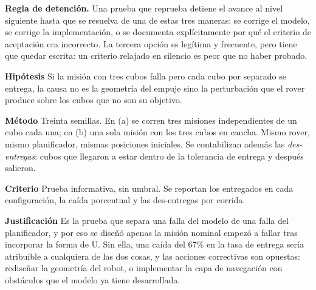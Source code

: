 \documentclass[11pt,a4paper]{article}
\newenvironment{prueba}[2]{%
  \par\medskip\noindent
  \begin{tcolorbox}[enhanced,breakable,colback=white,colframe=black!45,
    boxrule=0.5pt,arc=1pt,left=6pt,right=6pt,top=4pt,bottom=4pt,
    title={\bfseries #1\quad\normalfont #2},
    colbacktitle=black!8,coltitle=black,fonttitle=\bfseries\small]
  \small
}{\end{tcolorbox}\par\medskip}
\newcommand{\campo}[1]{\par\smallskip\noindent\textbf{#1}\quad\ignorespaces}
\begin{document}
\begin{tcolorbox}[colback=black!3,colframe=black!50,boxrule=0.5pt,arc=1pt]
\textbf{Regla de detención.} Una prueba que reprueba detiene el avance al nivel
siguiente hasta que se resuelva de una de estas tres maneras: se corrige el modelo, se
corrige la implementación, o se documenta explícitamente por qué el criterio de
aceptación era incorrecto. La tercera opción es legítima y frecuente, pero tiene que
quedar escrita: un criterio relajado en silencio es peor que no haber probado.
\end{tcolorbox}

\begin{prueba}{N4.8}{Interferencia entre tareas: un cubo por vez contra los tres a la vez}
\campo{Hipótesis} Si la misión con tres cubos falla pero cada cubo por separado se
entrega, la causa no es la geometría del empuje sino la perturbación que el rover produce
sobre los cubos que no son su objetivo.
\campo{Método} Treinta semillas. En (a) se corren tres misiones independientes de un cubo
cada una; en (b) una sola misión con los tres cubos en cancha. Mismo rover, mismo
planificador, mismas posiciones iniciales. Se contabilizan además las \emph{des-entregas}:
cubos que llegaron a estar dentro de la tolerancia de entrega y después salieron.
\campo{Criterio} Prueba informativa, sin umbral. Se reportan los entregados en cada
configuración, la caída porcentual y las des-entregas por corrida.
\campo{Justificación} Es la prueba que separa una falla del modelo de una falla del
planificador, y por eso se diseñó apenas la misión nominal empezó a fallar tras incorporar
la forma de U. Sin ella, una caída del $67\%$ en la tasa de entrega sería atribuible a
cualquiera de las dos cosas, y las acciones correctivas son opuestas: rediseñar la
geometría del robot, o implementar la capa de navegación con obstáculos que el modelo ya
tiene desarrollada.
\end{prueba}
\end{document}
